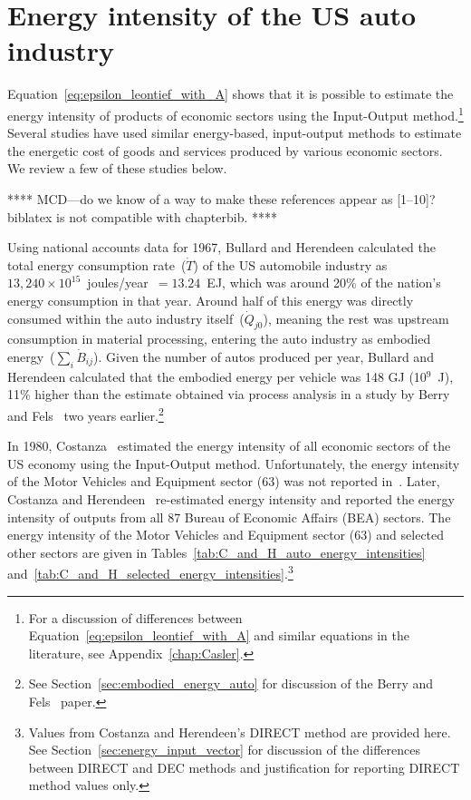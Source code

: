 \section{Energy intensity of the US auto industry}
\label{sec:intensity_auto}

Equation~\ref{eq:epsilon_leontief_with_A} shows 
that it is possible to estimate the energy intensity 
of products of economic sectors using the Input-Output method.\footnote{For a discussion
of differences between Equation~\ref{eq:epsilon_leontief_with_A} 
and similar equations in the literature, 
see Appendix~\ref{chap:Casler}.}
Several studies have used similar energy-based, 
input-output methods to estimate the energetic
cost of goods and services produced by various
economic sectors.\cite{Bullard1975, Costanza:1980ww, Costanza:1984tq, EIOLCA2014, Hendrickson2006,
Herendeen1973, Herendeen1974, Herendeen1974a, Herendeen1978,
Wright1974, Lenzen1998, Machado2001}
We review a few of these studies below.

**** MCD---do we know of a way to make these references
appear as [1--10]? biblatex is not compatible with chapterbib. ****

Using national accounts data for 1967,
Bullard and Herendeen calculated the
total energy consumption rate~($\dot{T}$)
of the US automobile industry as 
$13,240 \times 10^{15}$~joules/year~$= 13.24$~EJ,
which was around 20\% of the nation's
energy consumption in that year.\cite{Bullard1975}
Around half of this energy was directly
consumed within the auto industry itself~($\dot{Q}_{j0}$),
meaning the rest was upstream consumption
in material processing, 
entering the auto industry as embodied 
energy~($\sum_{i}\dot{B}_{ij}$).
Given the number of autos produced per year, 
Bullard and Herendeen calculated that 
the embodied energy per vehicle was 148 GJ (10$^{9}$~J),
11\% higher than the estimate obtained via process analysis in a
study by Berry and Fels~\cite{Berry:1973vo} two years earlier.\footnote{See
Section~\ref{sec:embodied_energy_auto} for discussion 
of the Berry and Fels~\cite{Berry:1973vo} paper.}

In 1980, Costanza~\cite{Costanza:1980ww} estimated 
the energy intensity of all economic sectors of the US economy
using the Input-Output method.
Unfortunately, the energy intensity 
of the Motor Vehicles and Equipment sector (63) was not reported
in~\cite{Costanza:1980ww}.
Later, Costanza and Herendeen~\cite{Costanza:1984tq} re-estimated
energy intensity and reported the energy intensity 
of outputs from all 87 Bureau of Economic Affairs 
(BEA) sectors.
The energy intensity of the Motor Vehicles and Equipment sector (63) 
and selected other sectors are given in 
Tables~\ref{tab:C_and_H_auto_energy_intensities}
and~\ref{tab:C_and_H_selected_energy_intensities}.\footnote{Values 
from Costanza and Herendeen's 
DIRECT method are provided here. 
See Section~\ref{sec:energy_input_vector} for discussion
of the differences between DIRECT and DEC methods
and justification for reporting
DIRECT method values only.} 

